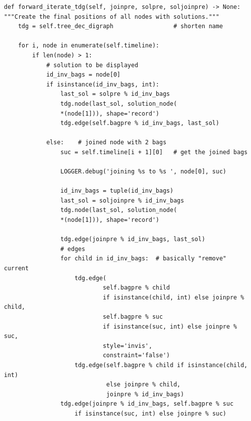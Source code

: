 \documentclass[a4paper, 12pt, bibliography=totoc]{scrartcl}
\begin{document}
\begin{lstlisting}[style=custompy, caption={forward\_iterate\_tdg}, label={lst:forward-iterate}]
def forward_iterate_tdg(self, joinpre, solpre, soljoinpre) -> None:
"""Create the final positions of all nodes with solutions."""
	tdg = self.tree_dec_digraph                 # shorten name
	
	for i, node in enumerate(self.timeline):
		if len(node) > 1:
			# solution to be displayed
			id_inv_bags = node[0]
			if isinstance(id_inv_bags, int):
				last_sol = solpre % id_inv_bags
				tdg.node(last_sol, solution_node(
				*(node[1])), shape='record')	
				tdg.edge(self.bagpre % id_inv_bags, last_sol)
			
			else:    # joined node with 2 bags
				suc = self.timeline[i + 1][0]   # get the joined bags
				
				LOGGER.debug('joining %s to %s ', node[0], suc)
				
				id_inv_bags = tuple(id_inv_bags)
				last_sol = soljoinpre % id_inv_bags
				tdg.node(last_sol, solution_node(
				*(node[1])), shape='record')
				
				tdg.edge(joinpre % id_inv_bags, last_sol)
				# edges
				for child in id_inv_bags:  # basically "remove" current
					tdg.edge(
							self.bagpre % child
							if isinstance(child, int) else joinpre % child,
							self.bagpre % suc
							if isinstance(suc, int) else joinpre % suc,
							style='invis',
							constraint='false')
					tdg.edge(self.bagpre % child if isinstance(child, int)
					         else joinpre % child,
					         joinpre % id_inv_bags)
				tdg.edge(joinpre % id_inv_bags, self.bagpre % suc
					if isinstance(suc, int) else joinpre % suc)
\end{lstlisting}
\end{document}
